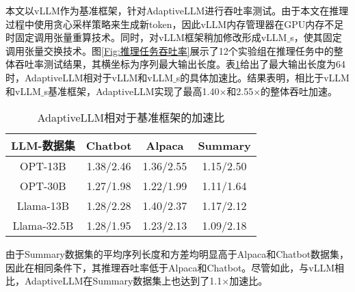 本文以vLLM作为基准框架，针对AdaptiveLLM进行吞吐率测试。由于本文在推理过程中使用贪心采样策略来生成新token，因此vLLM内存管理器在GPU内存不足时固定调用张量重算技术。同时，对vLLM框架稍加修改形成vLLM$\_$s，使其固定调用张量交换技术。图\ref{Fig:推理任务吞吐率}展示了12个实验组在推理任务中的整体吞吐率测试结果，其横坐标为序列最大输出长度。表\ref{Table:AdaptiveLLM相对于基准框架的加速比}给出了最大输出长度为64时，AdaptiveLLM相对于vLLM和vLLM$\_$s的具体加速比。结果表明，相比于vLLM和vLLM$\_$s基准框架，AdaptiveLLM实现了最高1.40$\times$和2.55$\times$的整体吞吐加速。

\begin{table}[H]
  \centering
  \caption{AdaptiveLLM相对于基准框架的加速比}
  \label{Table:AdaptiveLLM相对于基准框架的加速比}
  \renewcommand{\arraystretch}{1.25}
  \small
  \begin{tabular}{c c c c}
    \toprule
    \textbf{LLM-数据集} & \textbf{Chatbot} & \textbf{Alpaca} & \textbf{Summary} \\
    \midrule
    OPT-13B	& 1.38/2.46 & 1.36/2.55 & 1.15/2.50 \\
    OPT-30B	& 1.27/1.98 & 1.22/1.99 & 1.11/1.64 \\
    Llama-13B & 1.28/2.28 & 1.40/2.37 & 1.17/2.12 \\
    Llama-32.5B & 1.28/1.95 & 1.23/2.13 & 1.09/2.18 \\
    \bottomrule
  \end{tabular}
\end{table}

由于Summary数据集的平均序列长度和方差均明显高于Alpaca和Chatbot数据集，因此在相同条件下，其推理吞吐率低于Alpaca和Chatbot。尽管如此，与vLLM相比，AdaptiveLLM在Summary数据集上也达到了1.1$\times$加速比。

